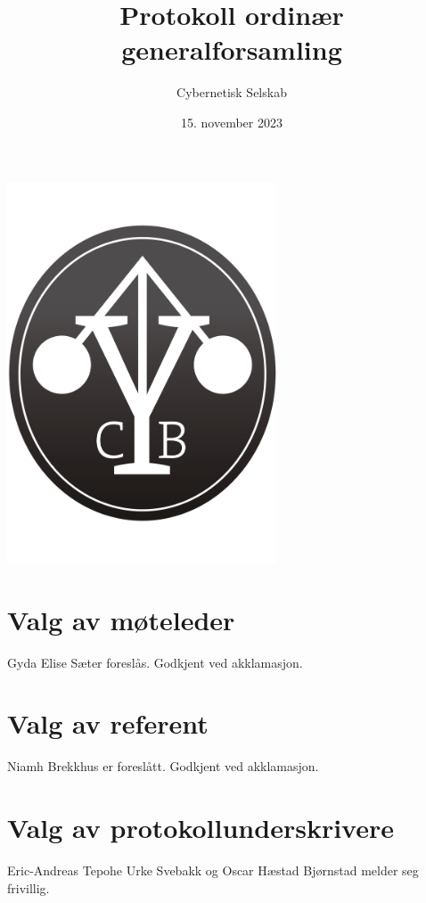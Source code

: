 \documentclass[10pt,norsk,a4paper,usenames,dvipsnames]{article}
\title{\huge Protokoll ordinær generalforsamling}
\author{\LARGE Cybernetisk Selskab}
\date{15. november 2023}
\begin{document}
\maketitle



\begin{center}


\includegraphics[width=0.6\textwidth,height=0.6\textheight,keepaspectratio=true]{cyblogoa3.pdf}

\end{center}


\newpage


\tableofcontents

\newpage

\section{Valg av møteleder}
Gyda Elise Sæter foreslås. Godkjent ved akklamasjon.

\section{Valg av referent}
Niamh Brekkhus er foreslått. Godkjent ved akklamasjon.

\section{Valg av protokollunderskrivere}
Eric-Andreas Tepohe Urke Svebakk og Oscar Hæstad Bjørnstad melder seg frivillig.
\end{document}
